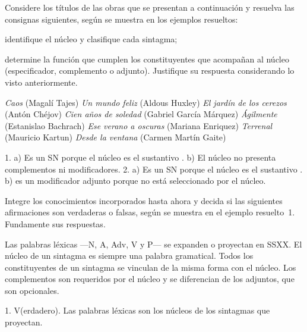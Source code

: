 \begin{ejercicio}\label{ej:05-titulos}
Considere los títulos de las obras que se presentan a continuación y resuelva
las consignas siguientes, según se muestra en los ejemplos resueltos:

\begin{consignas}
  \item identifique el núcleo y clasifique cada sintagma;
  \item determine la función que cumplen los constituyentes que acompañan al
        núcleo (especificador, complemento o adjunto). Justifique su respuesta
        considerando lo visto anteriormente.
\end{consignas}

\begin{exe}
  \ex \textit{Caos} (Magalí Tajes)
  \ex \textit{Un mundo feliz} (Aldous Huxley)
  \ex \textit{El jardín de los cerezos} (Antón Chéjov)
  \ex \textit{Cien años de soledad} (Gabriel García Márquez)
  \ex \textit{Ágilmente} (Estanislao Bachrach)
  \ex \textit{Ese verano a oscuras} (Mariana Enriquez)
  \ex \textit{Terrenal} (Mauricio Kartun)
  \ex \textit{Desde la ventana} (Carmen Martín Gaite)
\end{exe}

\begin{resuelto}
1. a) Es un SN porque el núcleo es el sustantivo . b) El núcleo no
presenta complementos ni modificadores. 2. a) Es un SN porque el núcleo es el
sustantivo . b)  es un modificador adjunto porque no
está seleccionado por el núcleo.
\end{resuelto}
\end{ejercicio}

\begin{ejercicio}\label{ej:05-vf}
Integre los conocimientos incorporados hasta ahora y decida si las siguientes
afirmaciones son verdaderas o falsas, según se muestra en el ejemplo
resuelto~1. Fundamente sus respuestas.

\begin{exe}
  \ex Las palabras léxicas ---N, A, Adv, V y P--- se expanden o proyectan en
      SSXX.
  \ex El núcleo de un sintagma es siempre una palabra gramatical.
  \ex Todos los constituyentes de un sintagma se vinculan de la misma forma con
      el núcleo.
  \ex Los complementos son requeridos por el núcleo y se diferencian de los
      adjuntos, que son opcionales.
\end{exe}

\begin{resuelto}
1. V(erdadero). Las palabras léxicas son los núcleos de los sintagmas que
proyectan.
\end{resuelto}
\end{ejercicio}


